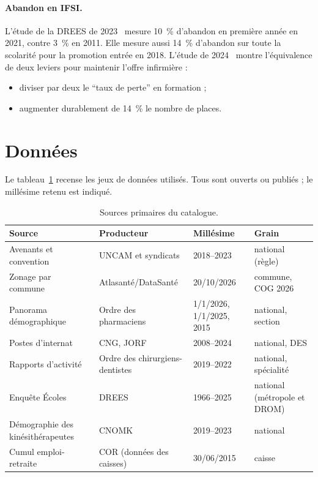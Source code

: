 \documentclass[11pt]{article}
\begin{document}
\paragraph{Abandon en IFSI.}
L'étude de la DREES de 2023~\cite{er1266} mesure 10~\% d'abandon en
première année en 2021, contre 3~\% en 2011. Elle mesure aussi 14~\%
d'abandon sur toute la scolarité pour la promotion entrée en 2018.
L'étude de 2024~\cite{er1319} montre l'équivalence de deux leviers pour
maintenir l'offre infirmière :
\begin{itemize}
\item diviser par deux le \enquote{taux de perte} en formation ;
\item augmenter durablement de 14~\% le nombre de places.
\end{itemize}

\section{Données}

Le tableau~\ref{tab:donnees} recense les jeux de données utilisés. Tous
sont ouverts ou publiés ; le millésime retenu est indiqué.

\begin{table}[htbp]
\centering\small
\caption{Sources primaires du catalogue.}\label{tab:donnees}
\begin{tabular}{p{4.2cm}p{3.2cm}p{3cm}p{3.6cm}}
\toprule
Source & Producteur & Millésime & Grain \\
\midrule
Avenants et convention~\cite{avenant6ide,avenant4sf,avenant7mk,conventioncd2023} & UNCAM et syndicats & 2018--2023 & national (règle) \\
Zonage par commune~\cite{zonagesdatagouv} & Atlasanté/DataSanté & 20/10/2026 & commune, COG 2026 \\
Panorama démographique~\cite{cnop2025,cnop2024,cnop2016} & Ordre des pharmaciens & 1/1/2026, 1/1/2025, 2015 & national, section \\
Postes d'internat~\cite{cng2018,arrete2023odonto,arrete2024odonto} & CNG, JORF & 2008--2024 & national, DES \\
Rapports d'activité~\cite{oncd2022} & Ordre des chirurgiens-dentistes & 2019--2022 & national, spécialité \\
Enquête Écoles~\cite{drees491} & DREES & 1966--2025 & national (métropole et DROM) \\
Démographie des kinésithérapeutes~\cite{cnomk2024} & CNOMK & 2019--2023 & national \\
Cumul emploi-retraite~\cite{cor2016} & COR (données des caisses) & 30/06/2015 & caisse \\
\bottomrule
\end{tabular}
\end{table}
\end{document}
